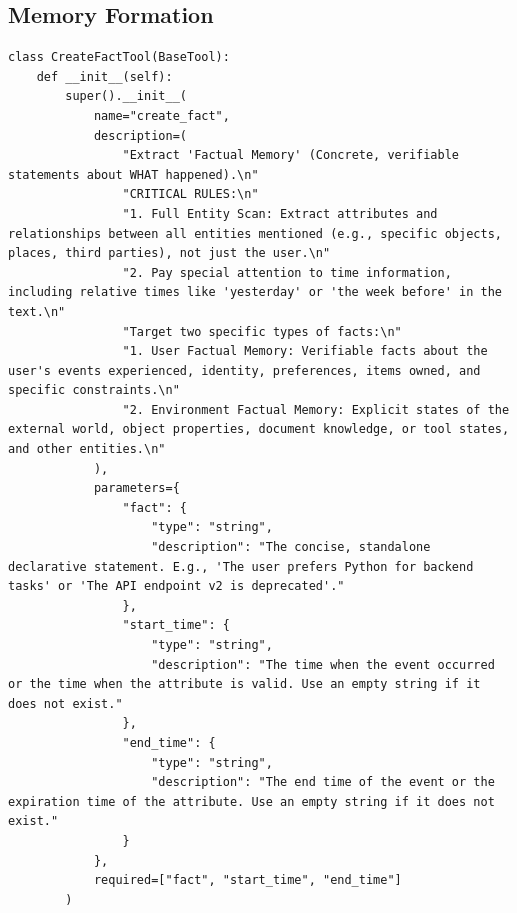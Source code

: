 \documentclass[11pt, a4paper]{lumia}
\begin{document}
\subsection{Memory Formation}
\begin{tcolorbox}[title={CreateFactTool}, sharp corners, breakable, 
      colframe=Periwinkle, colback=white, 
        boxrule=3pt, boxsep=0.5pt, enhanced, 
        shadow={3pt}{-3pt}{0pt}{opacity=1}]
        \footnotesize
        {\selectfont
\begin{lstlisting}[breaklines=true,showstringspaces=false]
class CreateFactTool(BaseTool):
    def __init__(self):
        super().__init__(
            name="create_fact",
            description=(
                "Extract 'Factual Memory' (Concrete, verifiable statements about WHAT happened).\n"
                "CRITICAL RULES:\n"
                "1. Full Entity Scan: Extract attributes and relationships between all entities mentioned (e.g., specific objects, places, third parties), not just the user.\n"
                "2. Pay special attention to time information, including relative times like 'yesterday' or 'the week before' in the text.\n"
                "Target two specific types of facts:\n"
                "1. User Factual Memory: Verifiable facts about the user's events experienced, identity, preferences, items owned, and specific constraints.\n"
                "2. Environment Factual Memory: Explicit states of the external world, object properties, document knowledge, or tool states, and other entities.\n"
            ),
            parameters={
                "fact": {
                    "type": "string", 
                    "description": "The concise, standalone declarative statement. E.g., 'The user prefers Python for backend tasks' or 'The API endpoint v2 is deprecated'."
                },
                "start_time": {
                    "type": "string", 
                    "description": "The time when the event occurred or the time when the attribute is valid. Use an empty string if it does not exist."
                },
                "end_time": {
                    "type": "string", 
                    "description": "The end time of the event or the expiration time of the attribute. Use an empty string if it does not exist."
                }
            },
            required=["fact", "start_time", "end_time"]
        )
\end{lstlisting}
}
\end{tcolorbox}
\end{document}
